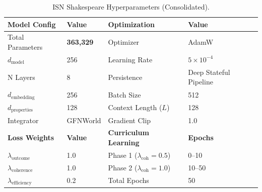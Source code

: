 \documentclass[12pt,a4paper]{article}
\begin{document}
\begin{table}[H]
    \centering
    \setlength{\tabcolsep}{8pt}
    \setlength{\extrarowheight}{2pt}
    \caption{ISN Shakespeare Hyperparameters (Consolidated).}
    \label{tab:reality-model-config}
    \begin{tabular}{ll|ll}
        \toprule
        \textbf{Model Config} & \textbf{Value} & \textbf{Optimization} & \textbf{Value} \\
        \midrule
        Total Parameters & \textbf{363,329} & Optimizer & AdamW \\
        $d_{\text{model}}$ & 256 & Learning Rate & $5 \times 10^{-4}$ \\
        N Layers & 8 & Persistence & Deep Stateful Pipeline \\
        $d_{\text{embedding}}$ & 256 & Batch Size & 512 \\
        $d_{\text{properties}}$ & 128 & Context Length ($L$) & 128 \\
        Integrator & GFNWorld & Gradient Clip & 1.0 \\
        \midrule
        \textbf{Loss Weights} & \textbf{Value} & \textbf{Curriculum Learning} & \textbf{Epochs} \\
        \midrule
        $\lambda_{\text{outcome}}$ & 1.0 & Phase 1 ($\lambda_{\text{coh}}=0.5$) & 0--10 \\
        $\lambda_{\text{coherence}}$ & 1.0 & Phase 2 ($\lambda_{\text{coh}}=1.0$) & 10--50 \\
        $\lambda_{\text{efficiency}}$ & 0.2 & Total Epochs & 50 \\
        \bottomrule
    \end{tabular}
\end{table}
\end{document}
